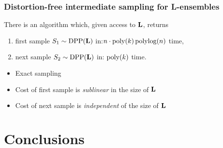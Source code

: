 \documentclass[handout]{beamer}
\begin{document}
\begin{frame}
  \frametitle{Distortion-free intermediate sampling for L-ensembles} 
  \begin{theorem}
There is an algorithm which, given access to $\mathbf{L}$, returns
\begin{enumerate}
\item first sample $S_1\sim{\mathrm{DPP}}(\mathbf{L})$ in:\quad $n\cdot{\mathrm{poly}}(k)\,{\mathrm{polylog}}(n)$ time,
\item next sample $S_2\sim{\mathrm{DPP}}(\mathbf{L})$ in:\hspace{6.4mm}  ${\mathrm{poly}}(k)$ time.
  \end{enumerate}
\end{theorem}
\pause

\begin{itemize}
\item Exact sampling\pause
\item Cost of first sample is \emph{sublinear} in the size of $\mathbf{L}$\pause
\item Cost of next sample is \emph{independent} of the size of $\mathbf{L}$
\end{itemize}
\end{frame}

\section{Conclusions}
\end{document}
